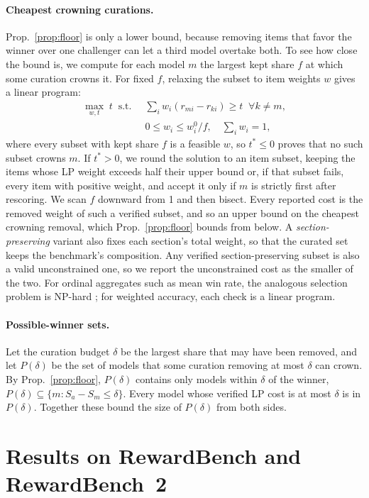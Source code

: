 \documentclass[11pt]{article}
\begin{document}
\paragraph{Cheapest crowning curations.} Prop.~\ref{prop:floor} is only a lower bound, because removing items that favor the winner over one challenger can let a third model overtake both. To see how close the bound is, we compute for each model $m$ the largest kept share $f$ at which some curation crowns it. For fixed $f$, relaxing the subset to item weights $w$ gives a linear program:
\begin{align*}
\max_{w,t}\; t \;\;\text{s.t.}\;\; &\textstyle\sum_i w_i (r_{mi}-r_{ki})\ge t \;\;\forall k\neq m,\\
&0\le w_i\le w^0_i/f,\quad \textstyle\sum_i w_i=1,
\end{align*}
where every subset with kept share $f$ is a feasible $w$, so $t^*\le 0$ proves that no such subset crowns $m$. If $t^*>0$, we round the solution to an item subset, keeping the items whose LP weight exceeds half their upper bound or, if that subset fails, every item with positive weight, and accept it only if $m$ is strictly first after rescoring. We scan $f$ downward from 1 and then bisect. Every reported cost is the removed weight of such a verified subset, and so an upper bound on the cheapest crowning removal, which Prop.~\ref{prop:floor} bounds from below. A \emph{section-preserving} variant also fixes each section's total weight, so that the curated set keeps the benchmark's composition. Any verified section-preserving subset is also a valid unconstrained one, so we report the unconstrained cost as the smaller of the two. For ordinal aggregates such as mean win rate, the analogous selection problem is NP-hard \citep{gordienko2026rig}; for weighted accuracy, each check is a linear program.

\paragraph{Possible-winner sets.} Let the curation budget $\delta$ be the largest share that may have been removed, and let $P(\delta)$ be the set of models that some curation removing at most $\delta$ can crown. By Prop.~\ref{prop:floor}, $P(\delta)$ contains only models within $\delta$ of the winner, $P(\delta)\subseteq\{m: S_a-S_m\le\delta\}$. Every model whose verified LP cost is at most $\delta$ is in $P(\delta)$. Together these bound the size of $P(\delta)$ from both sides.

\section{Results on RewardBench and RewardBench~2}\label{sec:results}
\end{document}

